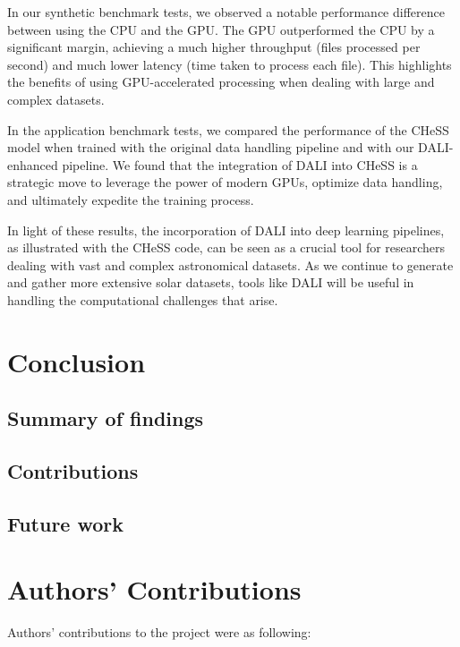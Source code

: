 \documentclass[licencjacka,en]{pracamgr}
\begin{document}
In our synthetic benchmark tests, we observed a notable performance difference between using the CPU and the GPU. The GPU outperformed the CPU by a significant margin, achieving a much higher throughput (files processed per second) and much lower latency (time taken to process each file). This highlights the benefits of using GPU-accelerated processing when dealing with large and complex datasets.

In the application benchmark tests, we compared the performance of the CHeSS model when trained with the original data handling pipeline and with our DALI-enhanced pipeline. We found that the integration of DALI into CHeSS is a strategic move to leverage the power of modern GPUs, optimize data handling, and ultimately expedite the training process. 


In light of these results, the incorporation of DALI into deep learning pipelines, as illustrated with the CHeSS code, can be seen as a crucial tool for researchers dealing with vast and complex astronomical datasets. As we continue to generate and gather more extensive solar datasets, tools like DALI will be useful in handling the computational challenges that arise. 

\chapter{Conclusion}\label{r:conclusion}

\section{Summary of findings}
\section{Contributions}
\section{Future work}


\chapter{Authors’ Contributions}
Authors’ contributions to the project were as following: 
\end{document}
